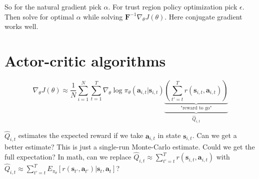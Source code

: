 \documentclass{report}
\begin{document}
So for the natural gradient pick $\alpha$.
For trust region policy optimization pick $\epsilon$.
Then solve for optimal $\alpha$ while solving $\bm{F}^{-1} \nabla_\theta J(\theta)$.
Here conjugate gradient works well.


\section{Actor-critic algorithms}

\begin{equation}
		\nabla_\theta J(\theta) \approx 
		\frac{1}{N} \sum_{i=1}^{N} \sum_{t=1}^{T} \nabla_\theta \log \pi_\theta (\bm{a}_{i,t}| \bm{s}_{i,t})
		\underbrace{\underbrace{\left ( \sum_{t'=t}^{T} r (\bm{s}_{i,t}, \bm{a}_{i,t}) \right )}_{\text{"reward to go"}}}_{\hat{Q}_{i,t}}
\end{equation}

$\hat{Q}_{i,t}$ estimates the expected reward if we take $\bm{a}_{i,t}$ in state $\bm{s}_{i,t}$.
Can we get a better estimate? This is just a single-run Monte-Carlo estimate.
Could we get the full expectation?
In math, can we replace $\hat{Q}_{i,t} \approx  \sum_{t'=t}^{T} r (\bm{s}_{i,t}, \bm{a}_{i,t}) $ with 
$\hat{Q}_{i,t} \approx  \sum_{t'=t}^{T} E_{\pi_\theta} \left[ r(\bm{s}_{t'}, \bm{a}_{t'}) |\bm{s}_{t}, \bm{a}_{t}  \right]   $?
\end{document}
